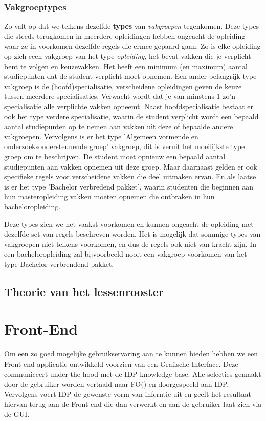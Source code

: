 \subsubsection{Vakgroeptypes}
Zo valt op dat we telkens dezelfde \textbf{types} van \emph{vakgroepen} tegenkomen. 
Deze types die steeds terugkomen in meerdere opleidingen hebben ongeacht de opleiding waar ze in voorkomen dezelfde regels die ermee gepaard gaan. Zo is elke opleiding op zich eeen vakgroep van het type \emph{opleiding}, het bevat vakken die je verplicht bent te volgen en keuzevakken. Het heeft een minimum (en maximum) aantal studiepunten dat de student verplicht moet opnemen. Een ander belangrijk type vakgroep is de (hoofd)specialisatie, verscheidene opleidingen geven de keuze tussen meerdere specialisaties. Verwacht wordt dat je van minstens 1 zo'n specialisatie alle verplichte vakken opneemt. Naast hoofdspecialisatie bestaat er ook het type verdere specialisatie, waarin de student verplicht wordt een bepaald aantal studiepunten op te nemen aan vakken uit deze of bepaalde andere vakgroepen. Vervolgens is er het type 'Algemeen vormende en onderzoeksondersteunende groep' vakgroep, dit is veruit het moeilijkste type groep om te beschrijven. De student moet opnieuw een bepaald aantal studiepunten aan vakken opnemen uit deze groep. Maar daarnaast gelden er ook specifieke regels voor verscheidene vakken die deel uitmaken ervan. En als laatse is er het type 'Bachelor verbredend pakket', waarin studenten die beginnen aan hun masteropleiding vakken moeten opnemen die ontbraken in hun bacheloropleiding.

Deze types zien we het vaakst voorkomen en kunnen ongeacht de opleiding met dezelfde set van regels beschreven worden. Het is mogelijk dat sommige types van vakgroepen niet telkens voorkomen, en dus de regels ook niet van kracht zijn. In een bacheloropleiding zal bijvoorbeeld nooit een vakgroep voorkomen van het type Bachelor verbrendend pakket. 

\subsection{Theorie van het lessenrooster}



\section{Front-End}

Om een zo goed mogelijke gebruikservaring aan te kunnen bieden hebben we een Front-end applicatie ontwikkeld voorzien van een Grafische Interface. Deze communiceert under the hood met de IDP knowledge base. Alle selecties gemaakt door de gebruiker worden vertaald naar FO(\textperiodcentered) en doorgespeeld aan IDP. Vervolgens voert IDP de gewenste vorm van inferntie uit en geeft het resultaat hiervan terug aan de Front-end die dan verwerkt en aan de gebruiker laat zien via de GUI.

